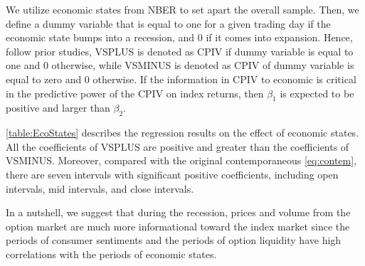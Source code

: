 We utilize economic states from NBER to set apart the overall sample. Then, we define a dummy variable that is equal to one for a given trading day if the economic state bumps into a recession, and 0 if it comes into expansion. Hence, follow prior studies, VSPLUS is denoted as CPIV if dummy variable is equal to one and 0 otherwise, while VSMINUS is denoted as CPIV of dummy variable is equal to zero and 0 otherwise. If the information in CPIV to economic is critical in the predictive power of the CPIV on index returns, then $\beta _{1}$ is expected to be positive and larger than $\beta _{2}$.

\autoref{table:EcoStates} describes the regression results on the effect of economic states. All the coefficients of VSPLUS are positive and greater than the coefficients of VSMINUS. Moreover, compared with the original contemporaneous \autoref{eq:contem}, there are seven intervals with significant positive coefficients, including open intervals, mid intervals, and close intervals. 

In a nutshell, we suggest that during the recession, prices and volume from the option market are much more informational toward the index market since the periods of consumer sentiments and the periods of option liquidity have high correlations with the periods of economic states.  












